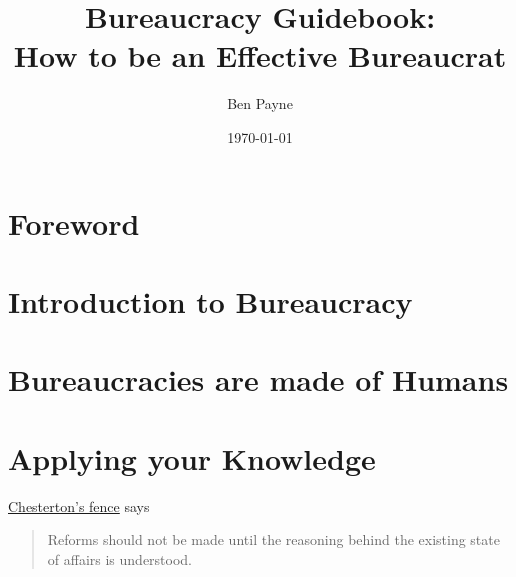 \documentclass{book}
\title{Bureaucracy Guidebook: \\How to be an Effective Bureaucrat}
\author{Ben Payne}
\date{\today}
\begin{document}
\maketitle
\frontmatter %



\chapter*{Foreword}%


\tableofcontents

\mainmatter %



\chapter{Introduction to Bureaucracy}







\chapter{Bureaucracies are made of Humans}
















\chapter{Applying your Knowledge}

\href{https://en.wikipedia.org/wiki/Wikipedia:Chesterton\%27s_fence}{Chesterton's fence} says
\begin{quote}
Reforms should not be made until the reasoning behind the existing state of affairs is understood.
\end{quote}



\clearpage

\printglossaries

\nocite{*} %


\end{document}

